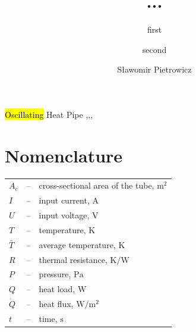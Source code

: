 \documentclass[article]{elsarticle}
\newcommand{\hlc}[2][yellow]{ {\sethlcolor{#1} \hl{#2}} }
\begin{document}
\begin{frontmatter}

\title{...}
 
 \author[pwr]{first}
 
 \author[pwr]{second}
   
 \author[pwr]{S\l awomir Pietrowicz}
 
 
 \address[pwr]{Department of Thermodynamics, Theory of Machines and Thermal Systems, Faculty of Mechanical and Power Engineering, Wrocław University of Technology, Wrocław Wybrzeże Wyspiańskiego 27, Poland}


\begin{abstract}

\end{abstract}

\begin{keyword}
\hlc{Oscillating} Heat Pipe \sep  \sep  \sep 
\end{keyword}

\end{frontmatter}

\linenumbers

\section*{Nomenclature}

\begin{tabular}{l c p{10.5cm}}

  $A_c$ & -- & cross-sectional area of the tube, $\mathrm{m^2}$ \\
  $I$ & -- & input current, $\mathrm{A}$ \\
  $U$ & -- & input voltage, $\mathrm{V}$ \\
  $T$ & -- & temperature, $\mathrm{K}$ \\
  $\bar{T}$ & -- & average temperature, $\mathrm{K}$ \\
  $R$ & -- & thermal resistance, $\mathrm{K/W}$ \\
  $P$ & -- & pressure, $\mathrm{Pa}$ \\
  $Q$ & -- & heat load, $\mathrm{W}$ \\
  $\dot{Q}$ & -- & heat flux, $\mathrm{W/m^2}$ \\
  $t$ & -- & time, $\mathrm{s}$ \\  
\end{tabular} 
\\ 
\end{document}

